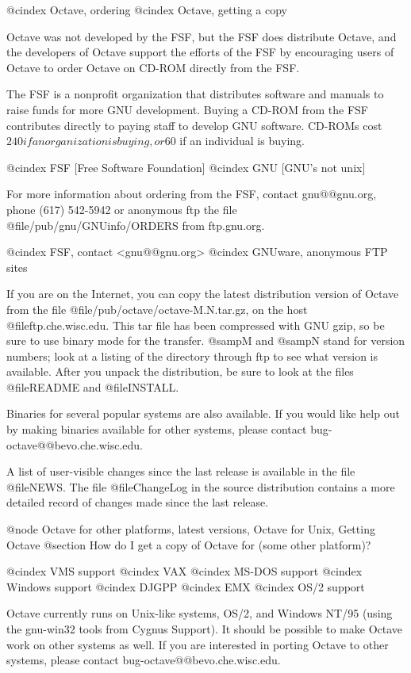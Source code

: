 @cindex Octave, ordering
@cindex Octave, getting a copy

Octave was not developed by the FSF, but the FSF does distribute Octave,
and the developers of Octave support the efforts of the FSF by
encouraging users of Octave to order Octave on CD-ROM directly from
the FSF.

The FSF is a nonprofit organization that distributes software and
manuals to raise funds for more GNU development.  Buying a CD-ROM from
the FSF contributes directly to paying staff to develop GNU software.
CD-ROMs cost $240 if an organization is buying, or $60 if an individual
is buying.

@cindex FSF [Free Software Foundation]
@cindex GNU [GNU's not unix]

For more information about ordering from the FSF, contact
gnu@@gnu.org, phone (617) 542-5942 or anonymous ftp the file
@file{/pub/gnu/GNUinfo/ORDERS} from ftp.gnu.org.

@cindex FSF, contact <gnu@@gnu.org>
@cindex GNUware, anonymous FTP sites

If you are on the Internet, you can copy the latest distribution
version of Octave from the file @file{/pub/octave/octave-M.N.tar.gz}, on
the host @file{ftp.che.wisc.edu}.  This tar file has been compressed
with GNU gzip, so be sure to use binary mode for the transfer.  @samp{M}
and @samp{N} stand for version numbers; look at a listing of the
directory through ftp to see what version is available.  After you
unpack the distribution, be sure to look at the files @file{README} and
@file{INSTALL}.

Binaries for several popular systems are also available.  If you would
like help out by making binaries available for other systems, please
contact bug-octave@@bevo.che.wisc.edu.

A list of user-visible changes since the last release is available in
the file @file{NEWS}.  The file @file{ChangeLog} in the source
distribution contains a more detailed record of changes made since the
last release.

@node Octave for other platforms, latest versions, Octave for Unix, Getting Octave
@section How do I get a copy of Octave for (some other platform)?

@cindex VMS support
@cindex VAX
@cindex MS-DOS support
@cindex Windows support
@cindex DJGPP
@cindex EMX
@cindex OS/2 support

Octave currently runs on Unix-like systems, OS/2, and Windows NT/95
(using the gnu-win32 tools from Cygnus Support).  It should be possible
to make Octave work on other systems as well.  If you are interested in
porting Octave to other systems, please contact
bug-octave@@bevo.che.wisc.edu.


